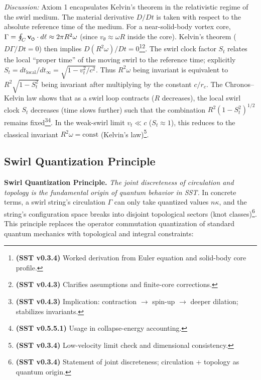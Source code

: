 \documentclass[reprint,aps,onecolumn,nofootinbib]{revtex4-2}
\newcommand{\swirlarrow}{%
    \mathchoice{\mkern-2mu\scriptstyle\boldsymbol{\circlearrowleft}}%
    {\mkern-2mu\scriptstyle\boldsymbol{\circlearrowleft}}%
    {\mkern-2mu\scriptscriptstyle\boldsymbol{\circlearrowleft}}%
    {\mkern-2mu\scriptscriptstyle\boldsymbol{\circlearrowleft}}%
}
\newcommand{\vswirl}{\mathbf{v}_{\swirlarrow}}
\begin{document}
    \noindent \textit{Discussion:} Axiom 1 encapsulates Kelvin’s theorem in the relativistic regime of the swirl medium. The material derivative $D/Dt$ is taken with respect to the absolute reference time of the medium. For a near-solid-body vortex core, $\Gamma = \oint_C \vswirl\cdot d\ell \approx 2\pi R^2 \omega$ (since $v_{\theta}\approx \omega R$ inside the core). Kelvin’s theorem ($D\Gamma/Dt=0$) then implies $D(R^2 \omega)/Dt=0$\footnote{\textbf{(SST v0.3.4)} Worked derivation from Euler equation and solid-body core profile.}\footnote{\textbf{(SST v0.4.3)} Clarifies assumptions and finite-core corrections.}. The swirl clock factor $S_t$ relates the local “proper time” of the moving swirl to the reference time; explicitly $S_t = dt_{\text{local}}/dt_{\infty} = \sqrt{1 - v_t^2/c^2}$. Thus $R^2 \omega$ being invariant is equivalent to $R^2 \sqrt{1 - S_t^2}$ being invariant after multiplying by the constant $c/r_c$. The Chronos–Kelvin law shows that as a swirl loop contracts ($R$ decreases), the local swirl clock $S_t$ decreases (time slows further) such that the combination $R^2 (1-S_t^2)^{1/2}$ remains fixed\footnote{\textbf{(SST v0.4.3)} Implication: contraction $\to$ spin-up $\to$ deeper dilation; stabilizes invariants.}\footnote{\textbf{(SST v0.5.5.1)} Usage in collapse-energy accounting.}. In the weak-swirl limit $v_t \ll c$ ($S_t\approx 1$), this reduces to the classical invariant $R^2 \omega = \text{const}$ (Kelvin’s law)\footnote{\textbf{(SST v0.3.4)} Low-velocity limit check and dimensional consistency.}.


    \subsection{Swirl Quantization Principle}
        \textbf{Swirl Quantization Principle.} \emph{The joint discreteness of circulation and topology is the fundamental origin of quantum behavior in SST.} In concrete terms, a swirl string’s circulation $\Gamma$ can only take quantized values $n\kappa$, and the string’s configuration space breaks into disjoint topological sectors (knot classes)\footnote{\textbf{(SST v0.3.4)} Statement of joint discreteness; circulation + topology as quantum origin.}. This principle replaces the operator commutation quantization of standard quantum mechanics with topological and integral constraints:
\end{document}
